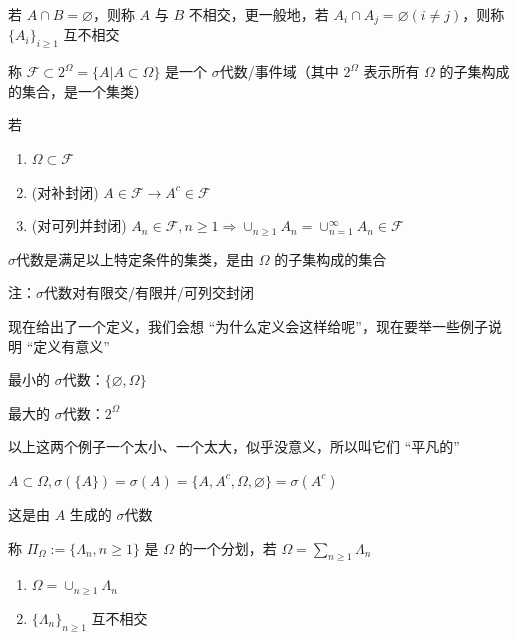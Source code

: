 \begin{definition}
    若 $A\cap B=\varnothing$，则称 $A$ 与 $B$ 不相交，更一般地，若 $A_i\cap A_j=\varnothing (i\neq j)$，则称 $\{A_i\}_{i\geq 1}$ 互不相交
\end{definition}

\begin{definition}
    称 $\mathcal{F}\subset 2^{\Omega}=\{A|A\subset \Omega\}$ 是一个 $\sigma$代数/事件域（其中 $2^{\Omega}$ 表示所有 $\Omega$ 的子集构成的集合，是一个集类）

    若\begin{enumerate}
        \item $\Omega\subset \mathcal{F}$
        \item (对补封闭) $A\in \mathcal{F}\rightarrow A^c\in \mathcal{F}$
        \item (对可列并封闭) $A_n\in \mathcal{F}, n\geq 1\Rightarrow \cup_{n\geq 1}A_n=\cup_{n=1}^{\infty} A_n\in\mathcal{F}$
    \end{enumerate}

    $\sigma$代数是满足以上特定条件的集类，是由 $\Omega$ 的子集构成的集合

    注：$\sigma$代数对有限交/有限并/可列交封闭
\end{definition}

现在给出了一个定义，我们会想 “为什么定义会这样给呢”，现在要举一些例子说明 “定义有意义”

\begin{example}
    最小的 $\sigma$代数：$\{\varnothing, \Omega\}$ 

    最大的 $\sigma$代数：$2^{\Omega}$
\end{example}

以上这两个例子一个太小、一个太大，似乎没意义，所以叫它们 “平凡的”

\begin{example}
    $A\subset \Omega, \sigma(\{A\})=\sigma(A)=\{A, A^c, \Omega, \varnothing\}=\sigma(A^c)$

    这是由 $A$ 生成的 $\sigma$代数
\end{example}

\begin{definition}[划分/分割]\label{def:partition}
    称 $\Pi_{\Omega}:= \{\Lambda_n, n\geq 1\}$ 是 $\Omega$ 的一个分划，若 $\Omega=\sum_{n\geq 1}\Lambda_n$

    \begin{enumerate}
        \item $\Omega=\cup_{n\geq 1}\Lambda_n$
        \item $\{\Lambda_n\}_{n\geq 1}$ 互不相交
    \end{enumerate}
\end{definition}


